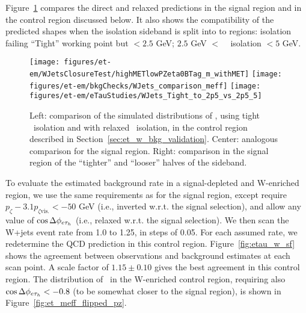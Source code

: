 Figure~\ref{fig:et-w-shape} compares the direct and relaxed
predictions in the signal region and in the control region discussed
below.  It also shows the compatibility of the predicted shapes when
the isolation sideband is split into to regions: \tauh isolation
failing ``Tight'' working point but $<2.5$ GeV; $2.5$ GeV $<$ \tauh ~
isolation $< 5$ GeV.

\begin{figure}[thbp!]\centering
  \texttt{[image: figures/et-em/WJetsClosureTest/highMETlowPZeta0BTag\_m\_withMET]}
  \texttt{[image: figures/et-em/bkgChecks/WJets\_comparison\_meff]}
  \texttt{[image: figures/et-em/eTauStudies/WJets\_Tight\_to\_2p5\_vs\_2p5\_5]}
  \caption{\label{fig:et-w-shape} Left: comparison of the simulated
    distributions of \meffetau , using tight \tauh ~isolation and with
    relaxed \tauh ~isolation, in the control region described in
    Section~\ref{sec:et_w_bkg_validation}.  Center: analogous
    comparison for the signal region.  Right: comparison in the signal
    region of the ``tighter'' and ``looser'' halves of the sideband.}
\end{figure}

To evaluate the estimated background rate in a signal-depleted and
W-enriched region, we use the same requirements as for the signal
region, except require $p_{\zeta} - 3.1 p_{\zeta\mathrm{vis.}}<
-50$ GeV (i.e., inverted w.r.t. the signal selection), and allow
any value of $\cos{\Delta\phi_{e\ensuremath{\tau_h}}}$ (i.e., relaxed w.r.t. the
signal selection).  We then scan the W+jets event rate from 1.0 to
1.25, in steps of 0.05.  For each assumed rate, we redetermine the QCD
prediction in this control region.  Figure~\ref{fig:etau_w_sf} shows
the agreement between observations and background estimates at each
scan point.  A scale factor of $1.15\pm0.10$ gives the best agreement
in this control region.  The distribution of \meffetau ~in the
W-enriched control region, requiring also
$\cos{\Delta\phi_{e\ensuremath{\tau_h}}}<-0.8$ (to be somewhat closer to the signal
region), is shown in Figure~\ref{fig:et_meff_flipped_pz}.

